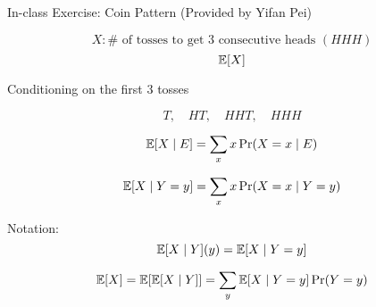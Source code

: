 \begin{frame}{}
  \begin{exampleblock}{In-class Exercise: Coin Pattern (Provided by Yifan Pei)}

    \vspace{-0.30cm}
    \[
      X: \# \text{ of tosses to get $3$ consecutive heads } (HHH)
    \]
    \[
      \operatorname*{\mathbb{E}}[X]
    \]
  \end{exampleblock}

  \pause
  \vspace{0.50cm}
  \centerline{Conditioning on the first $3$ tosses}

  \pause
  \[
    T, \quad HT, \quad HHT, \quad HHH
  \]
\end{frame}

\begin{frame}{}
  \begin{definition}
    \[
      \operatorname*{\mathbb{E}}[X \mid E] = \sum_{x} x \Pr(X = x \mid E)
    \]
  \end{definition}

  \pause
  \begin{definition}
    \[
      \operatorname*{\mathbb{E}}[X \mid Y = y] = \sum_{x} x \Pr(X = x \mid Y = y)
    \]
  \end{definition}

  \pause
  \begin{alertblock}{Notation:}
    \[
      \operatorname*{\mathbb{E}}[X \mid Y](y) = \operatorname*{\mathbb{E}}[X \mid Y = y]
    \]
  \end{alertblock}

  \pause
  \begin{theorem}
    \[
      \operatorname*{\mathbb{E}}[X] = \operatorname*{\mathbb{E}}[\operatorname*{\mathbb{E}}[X \mid Y]] = \sum_{y} \operatorname*{\mathbb{E}}[X \mid Y = y] \Pr(Y = y)
    \]
  \end{theorem}
\end{frame}
